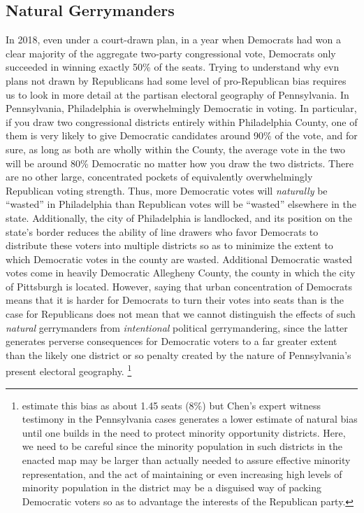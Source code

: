         \subsection*{Natural Gerrymanders}
    In 2018, even under a court-drawn plan, in a year when Democrats had won a clear majority of the aggregate two-party congressional vote, Democrats only succeeded in winning exactly 50\% of the seats. Trying to understand why evn plans not drawn by Republicans had some level of pro-Republican bias requires us to look in more detail at the partisan electoral geography of Pennsylvania. In Pennsylvania, Philadelphia is overwhelmingly Democratic in voting. In particular, if you draw two congressional districts entirely within Philadelphia County, one of them is very likely to give Democratic candidates around 90\% of the vote, and for sure, as long as both are wholly within the County, the average vote in the two will be around 80\% Democratic no matter how you draw the two districts. There are no other large, concentrated pockets of equivalently overwhelmingly Republican voting strength. Thus, more Democratic votes will \textit{naturally} be ``wasted'' in Philadelphia than Republican votes will be ``wasted'' elsewhere in the state. Additionally, the city of Philadelphia is landlocked, and its position on the state's border reduces the ability of line drawers who favor Democrats to distribute these voters into multiple districts so as to minimize the extent to which Democratic votes in the county are wasted. Additional Democratic wasted votes come in heavily Democratic Allegheny County, the county in which the city of Pittsburgh is located. However, saying that urban concentration of Democrats means that it is harder for Democrats to turn their votes into seats than is the case for Republicans does not mean that we cannot distinguish the effects of such \textit{natural} gerrymanders from \textit{intentional} political gerrymandering, since the latter generates perverse consequences for Democratic voters to a far greater extent than the likely one district or so penalty created by the nature of Pennsylvania’s present electoral geography. 
        \footnote{\citet{Chen2013} estimate this bias as about 1.45 seats (8\%) but Chen’s expert witness testimony in the Pennsylvania cases generates a lower estimate of natural bias until one builds in the need to protect minority opportunity districts. Here, we need to be careful since the minority population in such districts in the enacted map may be larger than actually needed to assure effective minority representation, and the act of maintaining or even increasing high levels of minority population in the district may be a disguised way of packing Democratic voters so as to advantage the interests of the Republican party.}
